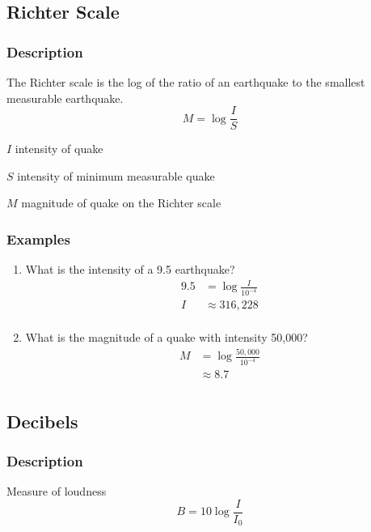 \documentclass{exam}
\begin{document}
  \subsection{Richter Scale}
  \subsubsection{Description}
  The Richter scale is the log of the ratio of an earthquake to the smallest measurable earthquake.
  \[
    M = \log \frac{I}{S}
  \]

  \begin{itemize*}
    \item $I$ intensity of quake 
    \item $S$ intensity of minimum measurable quake
    \item $M$ magnitude of quake on the Richter scale
  \end{itemize*}

  \subsubsection{Examples}
  \begin{enumerate}

    \item What is the intensity of a 9.5 earthquake?
      \begin{align*}
        9.5 & = \log \frac{I}{10^{-4}} \\
        I   & \approx 316,228 \\
      \end{align*}

    \item What is the magnitude of a quake with intensity 50,000?
      \begin{align*}
        M & = \log \frac{50,000}{10^{-4}} \\
           & \approx 8.7 \\
      \end{align*}

  \end{enumerate}

  \subsection{Decibels}

  \subsubsection{Description}
  Measure of loudness
  \[
    B = 10 \log \frac{I}{I_0}
  \]
  
\end{document}
